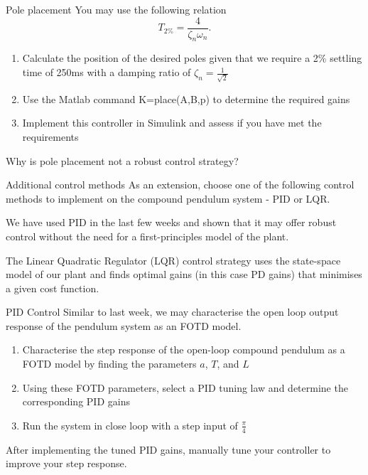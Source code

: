 \documentclass[9pt]{beamer-control}
\begin{document}
\begin{frame}{Pole placement}
You may use the following relation
\[ T_{2\%} = \frac{4}{\zeta_n \omega_n}. \]

\begin{enumerate}
	\item Calculate the position of the desired poles given that we require a 2\% settling time of 250ms with a damping ratio of $\zeta_n=\tfrac{1}{\sqrt{2}}$
	\item Use the Matlab command K=place(A,B,p) to determine the required gains 
	\item Implement this controller in Simulink and assess if you have met the requirements
\end{enumerate}

Why is pole placement not a robust control strategy?

\end{frame}


\begin{frame}{Additional control methods}
As an extension, choose one of the following control methods to implement on the compound pendulum system - PID or LQR.

We have used PID in the last few weeks and shown that it may offer robust control without the need for a first-principles model of the plant.

The Linear Quadratic Regulator (LQR) control strategy uses the state-space model of our plant and finds optimal gains (in this case PD gains) that minimises a given cost function.
\end{frame}

\begin{frame}{PID Control}
Similar to last week, we may characterise the open loop output response of the pendulum system as an FOTD model.

\begin{enumerate}
	\item Characterise the step response of the open-loop compound pendulum as a FOTD model by finding the parameters $a$, $T$, and $L$
	\item Using these FOTD parameters, select a PID tuning law and determine the corresponding PID gains
	\item Run the system in close loop with a step input of $\tfrac{\pi}{4}$
	
\end{enumerate}

After implementing the tuned PID gains, manually tune your controller to improve your step response.

\end{frame}
\end{document}
